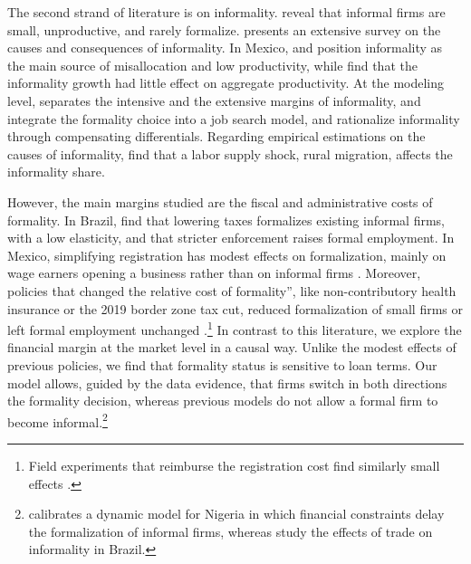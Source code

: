 \documentclass[12pt]{article}
\begin{document}
The second strand of literature is on informality. \citet{la2014informality} reveal that informal firms are small, unproductive, and rarely formalize. \citet{ulyssea2020informality} presents an extensive survey on the causes and consequences of informality. In Mexico, \citet{levy2018under} and \citet{busso2012formal} position informality as the main source of misallocation and low productivity, while \citet{alvarez2024informality} find that the informality growth had little effect on aggregate productivity. At the modeling level, \citet{ulyssea2018firms} separates the intensive and the extensive margins of informality, \citet{meghir2015wages} and \citet{bobba2021labor} integrate the formality choice into a job search model, and \citet{haanwinckel2021workforce} rationalize informality through compensating differentials. Regarding empirical estimations on the causes of informality, \citet{imbert2026rural} find that a labor supply shock, rural migration, affects the informality share. 

However, the main margins studied are the fiscal and administrative costs of formality. In Brazil, \citet{rocha2018lower} find that lowering taxes formalizes existing informal firms, with a low elasticity, and \citet{almeida2012enforcement} that stricter enforcement raises formal employment. In Mexico, simplifying registration has modest effects on formalization, mainly on wage earners opening a business rather than on informal firms \citep{bruhn2011license, kaplan2011entry}. Moreover, policies that changed the relative cost of formality”, like non-contributory health insurance or the 2019 border zone tax cut, reduced formalization of small firms or left formal employment unchanged \citep{bosch2014trade, campos2020effects}.\footnote{Field experiments that reimburse the registration cost find similarly small effects \citep{de2013demand}.} In contrast to this literature, we explore the financial margin at the market level in a causal way. Unlike the modest effects of previous policies, we find that formality status is sensitive to loan terms. Our model allows, guided by the data evidence, that firms switch in both directions the formality decision, whereas previous models do not allow a formal firm to become informal.\footnote{\citet{adom2025structural} calibrates a dynamic model for Nigeria in which financial constraints delay the formalization of informal firms, whereas \citet{dix2021trade} study the effects of trade on informality in Brazil.}
\end{document}
